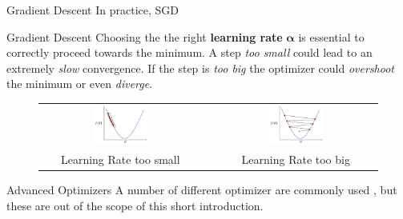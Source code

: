 \documentclass[aspectratio=169]{beamer}
\begin{document}

\begin{frame}{Gradient Descent}
In practice, SGD

\end{frame}


\begin{frame}{Gradient Descent}
Choosing the the right \textbf{learning rate} $\bm{\alpha}$ is essential to correctly proceed towards the minimum. A step \textit{too small} could lead to an extremely \textit{slow} convergence. If the step is \textit{too big} the optimizer could \textit{overshoot} the minimum or even \textit{diverge}. 
\begin{figure}
\begin{tabular}{ccc}
\includegraphics[width=0.35\textwidth]{img/sgd/lr_too_small.png} &
\quad &
\includegraphics[width=0.35\textwidth]{img/sgd/lr_too_big.png}\\
Learning Rate too small & & Learning Rate too big
\end{tabular}
\end{figure}

\end{frame}


\begin{frame}{Advanced Optimizers}
A number of different optimizer \cite{kingma2014adam,duchi2011adaptive,zeiler2012adadelta} are commonly used , but these are out of the scope of this short introduction.
\end{frame}
\end{document}

